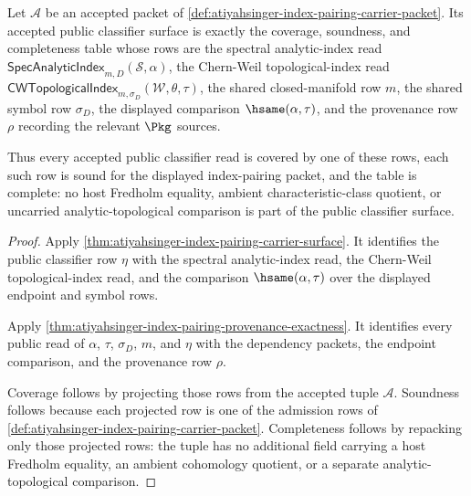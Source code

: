 \begin{theorem}
\label{thm:atiyahsinger-index-pairing-classifier-coverage}
Let $\mathcal{A}$ be an accepted packet of
\autoref{def:atiyahsinger-index-pairing-carrier-packet}. Its accepted public
classifier surface is exactly the coverage, soundness, and completeness table
whose rows are the spectral analytic-index read
$\mathsf{SpecAnalyticIndex}_{m,D}(\mathcal{S},\alpha)$, the Chern-Weil
topological-index read
$\mathsf{CWTopologicalIndex}_{m,\sigma_D}(\mathcal{W},\theta,\tau)$, the shared
closed-manifold row $m$, the shared symbol row $\sigma_D$, the displayed
comparison $\hsame(\alpha,\tau)$, and the provenance row $\rho$ recording the
relevant $\Pkg$ sources.

Thus every accepted public classifier read is covered by one of these rows,
each such row is sound for the displayed index-pairing packet, and the table is
complete: no host Fredholm equality, ambient characteristic-class quotient, or
uncarried analytic-topological comparison is part of the public classifier
surface.
\end{theorem}
\begin{proof}
Apply \autoref{thm:atiyahsinger-index-pairing-carrier-surface}. It identifies
the public classifier row $\eta$ with the spectral analytic-index read, the
Chern-Weil topological-index read, and the comparison $\hsame(\alpha,\tau)$
over the displayed endpoint and symbol rows.

Apply \autoref{thm:atiyahsinger-index-pairing-provenance-exactness}. It
identifies every public read of $\alpha$, $\tau$, $\sigma_D$, $m$, and $\eta$
with the dependency packets, the endpoint comparison, and the provenance row
$\rho$.

Coverage follows by projecting those rows from the accepted tuple
$\mathcal{A}$. Soundness follows because each projected row is one of the
admission rows of \autoref{def:atiyahsinger-index-pairing-carrier-packet}.
Completeness follows by repacking only those projected rows: the tuple has no
additional field carrying a host Fredholm equality, an ambient cohomology
quotient, or a separate analytic-topological comparison.
\end{proof}

